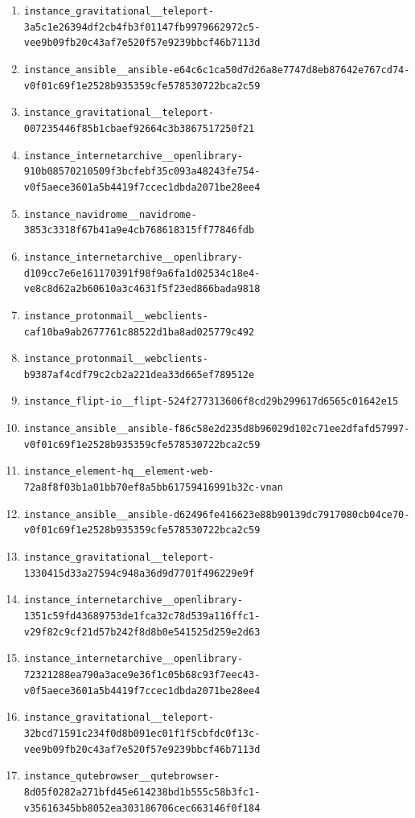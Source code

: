 \documentclass{llmxive}
\begin{document}
\begin{enumerate}
\item \texttt{instance\_gravitational\_\_teleport-3a5c1e26394df2cb4fb3f01147fb9979662972c5-vee9b09fb20c43af7e520f57e9239bbcf46b7113d}
\item \texttt{instance\_ansible\_\_ansible-e64c6c1ca50d7d26a8e7747d8eb87642e767cd74-v0f01c69f1e2528b935359cfe578530722bca2c59}
\item \texttt{instance\_gravitational\_\_teleport-007235446f85b1cbaef92664c3b3867517250f21}
\item \texttt{instance\_internetarchive\_\_openlibrary-910b08570210509f3bcfebf35c093a48243fe754-v0f5aece3601a5b4419f7ccec1dbda2071be28ee4}
\item \texttt{instance\_navidrome\_\_navidrome-3853c3318f67b41a9e4cb768618315ff77846fdb}
\item \texttt{instance\_internetarchive\_\_openlibrary-d109cc7e6e161170391f98f9a6fa1d02534c18e4-ve8c8d62a2b60610a3c4631f5f23ed866bada9818}
\item \texttt{instance\_protonmail\_\_webclients-caf10ba9ab2677761c88522d1ba8ad025779c492}
\item \texttt{instance\_protonmail\_\_webclients-b9387af4cdf79c2cb2a221dea33d665ef789512e}
\item \texttt{instance\_flipt-io\_\_flipt-524f277313606f8cd29b299617d6565c01642e15}
\item \texttt{instance\_ansible\_\_ansible-f86c58e2d235d8b96029d102c71ee2dfafd57997-v0f01c69f1e2528b935359cfe578530722bca2c59}
\item \texttt{instance\_element-hq\_\_element-web-72a8f8f03b1a01bb70ef8a5bb61759416991b32c-vnan}
\item \texttt{instance\_ansible\_\_ansible-d62496fe416623e88b90139dc7917080cb04ce70-v0f01c69f1e2528b935359cfe578530722bca2c59}
\item \texttt{instance\_gravitational\_\_teleport-1330415d33a27594c948a36d9d7701f496229e9f}
\item \texttt{instance\_internetarchive\_\_openlibrary-1351c59fd43689753de1fca32c78d539a116ffc1-v29f82c9cf21d57b242f8d8b0e541525d259e2d63}
\item \texttt{instance\_internetarchive\_\_openlibrary-72321288ea790a3ace9e36f1c05b68c93f7eec43-v0f5aece3601a5b4419f7ccec1dbda2071be28ee4}
\item \texttt{instance\_gravitational\_\_teleport-32bcd71591c234f0d8b091ec01f1f5cbfdc0f13c-vee9b09fb20c43af7e520f57e9239bbcf46b7113d}
\item \texttt{instance\_qutebrowser\_\_qutebrowser-8d05f0282a271bfd45e614238bd1b555c58b3fc1-v35616345bb8052ea303186706cec663146f0f184}

\end{enumerate}
\end{document}
